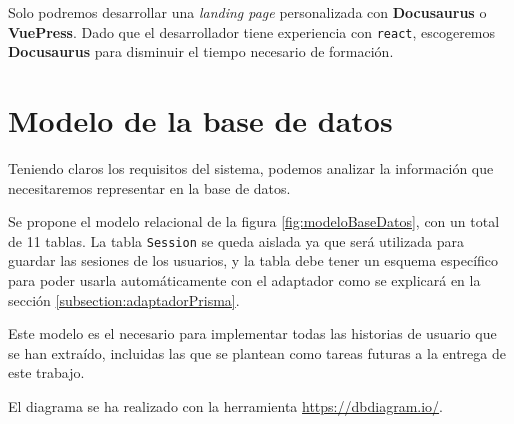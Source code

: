Solo podremos desarrollar una \textit{landing page} personalizada con \textbf{Docusaurus} o \textbf{VuePress}. Dado que el desarrollador tiene experiencia con \texttt{react}, escogeremos \textbf{Docusaurus} para disminuir el tiempo necesario de formación.

\section{Modelo de la base de datos}

Teniendo claros los requisitos del sistema, podemos analizar la información que necesitaremos representar en la base de datos.

Se propone el modelo relacional de la figura \ref{fig:modeloBaseDatos}, con un total de 11 tablas. La tabla \texttt{Session} se queda aislada ya que será utilizada para guardar las sesiones de los usuarios, y la tabla debe tener un esquema específico para poder usarla automáticamente con el adaptador como se explicará en la sección \ref{subsection:adaptadorPrisma}.

Este modelo es el necesario para implementar todas las historias de usuario que se han extraído, incluidas las que se plantean como tareas futuras a la entrega de este trabajo.

El diagrama se ha realizado con la herramienta \url{https://dbdiagram.io/}.


